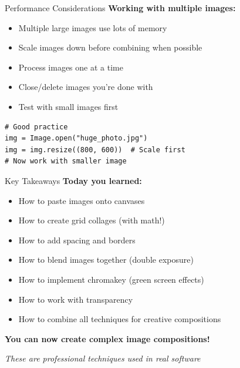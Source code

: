 \documentclass{csbeamer}
\begin{document}
\begin{frame}[fragile]{Performance Considerations}
    \textbf{Working with multiple images:}

    \vspace{1em}

    \begin{itemize}
        \item Multiple large images use lots of memory
        \item Scale images down before combining when possible
        \item Process images one at a time
        \item Close/delete images you're done with
        \item Test with small images first
    \end{itemize}

    \vspace{1em}

    \begin{lstlisting}
# Good practice
img = Image.open("huge_photo.jpg")
img = img.resize((800, 600))  # Scale first
# Now work with smaller image
    \end{lstlisting}
\end{frame}

\begin{frame}{Key Takeaways}
    \textbf{Today you learned:}
    \begin{itemize}
        \item  How to paste images onto canvases
        \item  How to create grid collages (with math!)
        \item  How to add spacing and borders
        \item  How to blend images together (double exposure)
        \item  How to implement chromakey (green screen effects)
        \item  How to work with transparency
        \item  How to combine all techniques for creative compositions
    \end{itemize}

    \vspace{1em}

    \begin{center}
        \textbf{You can now create complex image compositions!}

        \vspace{0.5em}

        \textit{These are professional techniques used in real software}
    \end{center}
\end{frame}
\end{document}
